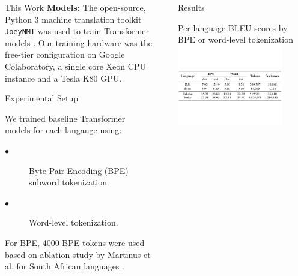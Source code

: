 \documentclass[final]{beamer}
\newlength{\sepwid}
\newlength{\onecolwid}
\newlength{\twocolwid}
\begin{document}
\begin{frame}[t]
\begin{columns}[t]
\begin{column}{\onecolwid}
\begin{block}{This Work}
\textbf{Models:} The open-source, Python 3 machine translation toolkit \texttt{JoeyNMT} was used to train Transformer models \cite{NIPS2017_7181}. Our training hardware was the free-tier configuration on Google Colaboratory, a single core Xeon CPU instance and a Tesla K80 GPU.

\end{block}

\begin{block}{Experimental Setup}

  We trained baseline Transformer models for each langauge using:
\begin{description}
  \item[$\bullet$] Byte Pair Encoding (BPE) subword tokenization
  \item[$\bullet$] Word-level tokenization.
\end{description}

For BPE, 4000 BPE tokens were used based on ablation study by Martinus et al. for South African languages \cite{focus_southafrica}.

\end{block}

\end{column} %


\begin{column}{\sepwid}\end{column} %

\begin{column}{\twocolwid} %

\begin{block}{Results}

\begin{center}
Per-language BLEU scores by BPE or word-level tokenization
  \includegraphics[trim = 0mm 60mm 0mm 55mm, clip, width=0.8\textwidth]{figures/edoid_nmt_results.pdf}
\end{center}


\end{block}
\end{column}
\end{columns}
\end{frame}
\end{document}

